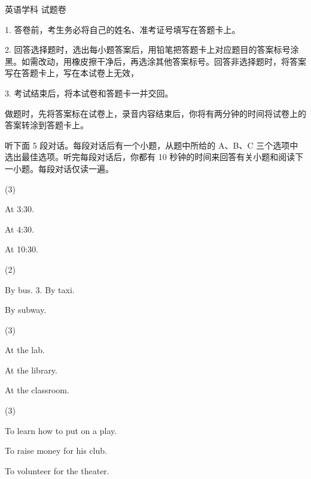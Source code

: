 \documentclass{英语试卷}
\begin{document}
\par 英语学科 试题卷\par
\begin{notice}
\par 1. 答卷前，考生务必将自己的姓名、准考证号填写在答题卡上。\par
\par 2. 回答选择题时，选出每小题答案后，用铅笔把答题卡上对应题目的答案标号涂黑。如需改动，用橡皮擦干净后，再选涂其他答案标号。回答非选择题时，将答案写在答题卡上，写在本试卷上无效，\par
\par 3. 考试结束后，将本试卷和答题卡一并交回。\par
\end{notice}
\par 做题时，先将答案标在试卷上，录音内容结束后，你将有两分钟的时间将试卷上的答案转涂到答题卡上。\par
{}
\par 听下面 5 段对话。每段对话后有一个小题，从题中所给的 A、B、C 三个选项中选出最佳选项。听完每段对话后，你都有 10 秒钟的时间来回答有关小题和阅读下一小题。每段对话仅读一遍。\par
{}
\begin{choices}(3)
  \item At 3:30.
  \item At 4:30.
  \item At 10:30.
\end{choices}
\begin{choices}(2)
  \item By bus. 3. By taxi.
  \item By subway.
\end{choices}
\begin{choices}(3)
  \item At the lab.
  \item At the library.
  \item At the classroom.
\end{choices}
\begin{choices}(3)
  \item To learn how to put on a play.
  \item To raise money for his club.
  \item To volunteer for the theater.
\end{choices}
\end{document}
